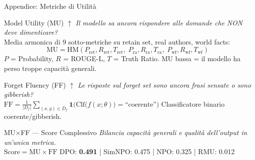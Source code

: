 \documentclass[aspectratio=169,11pt]{beamer}
\begin{document}
\begin{frame}{Appendice: Metriche di Utilit\`a}
  \scriptsize
  \begin{block}{Model Utility (MU) $\uparrow$}
    \textit{Il modello sa ancora rispondere alle domande che NON deve dimenticare?}\\[0.3em]
    Media armonica di 9 sotto-metriche su retain set, real authors, world facts:
    \vspace{-0.3em}
    \[
      \text{MU} = \text{HM}\!\left(
        P_{\text{ret}}, R_{\text{ret}}, T_{\text{ret}},\;
        P_{\text{ra}}, R_{\text{ra}}, T_{\text{ra}},\;
        P_{\text{wf}}, R_{\text{wf}}, T_{\text{wf}}
      \right)
    \]
    \vspace{-0.1em}
    {\tiny $P$ = Probability, $R$ = ROUGE-L, $T$ = Truth Ratio. MU bassa = il modello ha perso troppe capacit\`a generali.}
  \end{block}
  \vspace{-0.3em}
  \begin{block}{Forget Fluency (FF) $\uparrow$}
    \textit{Le risposte sul forget set sono ancora frasi sensate o sono gibberish?}\\[0.3em]
    $\text{FF} = \frac{1}{|D_f|} \sum_{(x,y) \in D_f}
    \mathbf{1}\!\Big(\text{Clf}\!\big(f(x;\theta)\big) = \text{``coerente''}\Big)$
    \hfill {\tiny Classificatore binario coerente/gibberish.}
  \end{block}
  \vspace{-0.3em}
  \begin{block}{MU$\times$FF — Score Complessivo}
    \textit{Bilancia capacit\`a generali e qualit\`a dell'output in un'unica metrica.}\\[0.3em]
    $\text{Score} = \text{MU} \times \text{FF}$
    \hfill DPO: \textbf{0.491} | SimNPO: 0.475 | NPO: 0.325 | RMU: 0.012
  \end{block}
\end{frame}
\end{document}

